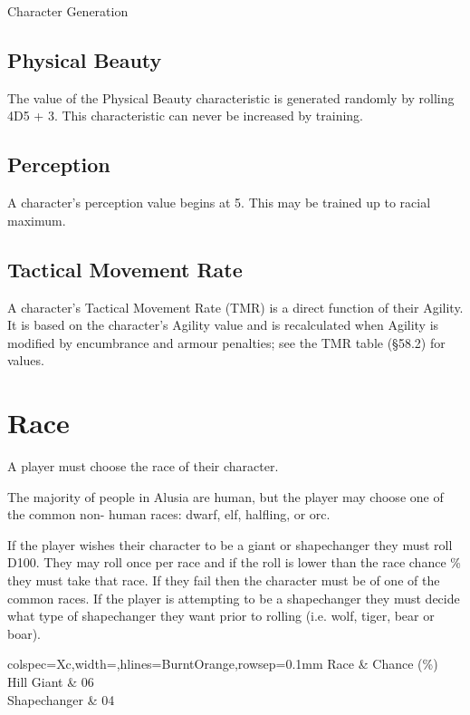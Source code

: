 \begin{Chapter}{Character Generation}
\subsection{Physical Beauty}

The value of the Physical Beauty characteristic is generated randomly
by rolling 4D5 + 3. This characteristic can never be increased by
training.

\subsection{Perception}

A character’s perception value begins at 5.  This may be trained up to
racial maximum.

\subsection{Tactical Movement Rate}

A character’s Tactical Movement Rate (TMR) is a direct function of
their Agility.  It is based on the character’s Agility value and is
recalculated when Agility is modified by encumbrance and armour
penalties; see the TMR table (§58.2) for values.


\section{Race}
\label{race}

A player must choose the race of their character.

The majority of people in Alusia are human, but the player may choose
one of the common non- human races: dwarf, elf, halfling, or orc.

If the player wishes their character to be a giant or shapechanger
they must roll D100.  They may roll once per race and if the roll is
lower than the race chance \% they must take that race. If they fail
then the character must be of one of the common races.  If the player
is attempting to be a shapechanger they must decide what type of
shapechanger they want prior to rolling (i.e. wolf, tiger, bear or
boar).


\begin{tblr}{colspec={Xc},width=\linewidth,hlines={BurntOrange},rowsep=0.1mm}
Race		& Chance (\%) \\
Hill Giant	& 06 \\
Shapechanger	& 04 \\
\end{tblr}


\end{Chapter}
